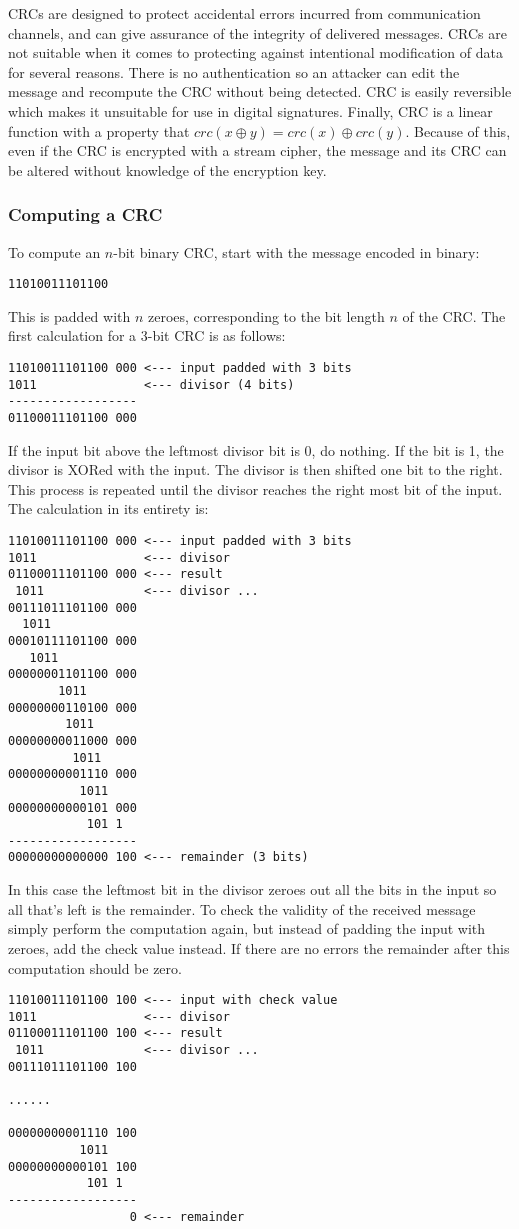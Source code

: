 \documentclass{article}
\begin{document}
CRCs are designed to protect accidental errors incurred from communication channels, and can give assurance of the integrity of delivered messages. CRCs are not suitable when it comes to protecting against intentional modification of data for several reasons. There is no authentication so an attacker can edit the message and recompute the CRC without being detected. CRC is easily reversible which makes it unsuitable for use in digital signatures. Finally, CRC is a linear function with a property that $crc(x \oplus y) = crc(x) \oplus crc(y)$. Because of this, even if the CRC is encrypted with a stream cipher, the message and its CRC can be altered without knowledge of the encryption key. 

\subsubsection{Computing a CRC}
To compute an $n$-bit binary CRC, start with the message encoded in binary:
\begin{verbatim}
11010011101100
\end{verbatim}
This is padded with $n$ zeroes, corresponding to the bit length $n$ of the CRC. The first calculation for a 3-bit CRC is as follows:
\begin{verbatim}
11010011101100 000 <--- input padded with 3 bits
1011               <--- divisor (4 bits) 
------------------
01100011101100 000
\end{verbatim}
If the input bit above the leftmost divisor bit is 0, do nothing. If the bit is 1, the divisor is XORed with the input. The divisor is then shifted one bit to the right. This process is repeated until the divisor reaches the right most bit of the input. The calculation in its entirety is:
\begin{verbatim}
11010011101100 000 <--- input padded with 3 bits
1011               <--- divisor
01100011101100 000 <--- result
 1011              <--- divisor ...
00111011101100 000
  1011
00010111101100 000
   1011
00000001101100 000
       1011
00000000110100 000
        1011
00000000011000 000
         1011
00000000001110 000
          1011
00000000000101 000
           101 1
------------------
00000000000000 100 <--- remainder (3 bits)
\end{verbatim}

In this case the leftmost bit in the divisor zeroes out all the bits in the input so all that's left is the remainder. To check the validity of the received message simply perform the computation again, but instead of padding the input with zeroes, add the check value instead. If there are no errors the remainder after this computation should be zero.
\begin{verbatim}
11010011101100 100 <--- input with check value
1011               <--- divisor
01100011101100 100 <--- result
 1011              <--- divisor ...
00111011101100 100

......
  
00000000001110 100
          1011
00000000000101 100 
           101 1
------------------
                 0 <--- remainder
\end{verbatim}
\end{document}
